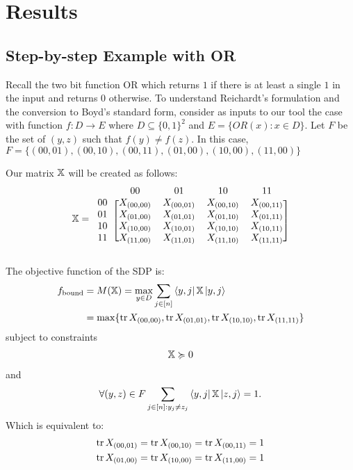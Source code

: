 \section{Results}

\subsection{Step-by-step Example with OR}
Recall the two bit function OR which returns $1$ if there
is at least a single $1$ in the input and returns $0$ otherwise.
To understand Reichardt's formulation and the conversion
to Boyd's standard form, consider as inputs to our tool
the case with function $f: D \rightarrow E$ where
$D \subseteq {\{0,1\}}^2$ and $E =\{OR(x): x \in D \}$.
Let $F$ be the set of $(y,z)$ such that $f(y) \neq f(z)$. In this
case, $F = \{(00,01), (00,10), (00,11), (01,00), (10,00), (11,00)\}$

Our matrix $\operatorname{\mathbb{X}}$ will be created as follows:
\begin{align}
\X = \begin{blockarray}{ccccc}
\qquad & 00 & 01 & 10 & 11 \\
\begin{block}{c[cccc]}
  00 & X_{(00,00)} & X_{(00,01)} & X_{(00,10)} & X_{(00,11)}\\
  01 & X_{(01,00)} & X_{(01,01)} & X_{(01,10)} & X_{(01,11)}\\
  10 & X_{(10,00)} & X_{(10,01)} & X_{(10,10)} & X_{(10,11)}\\
  11 & X_{(11,00)} & X_{(11,01)} & X_{(11,10)} & X_{(11,11)}\\
\end{block}
\end{blockarray} \nonumber 
\end{align}


The objective function of the SDP is:
\begin{align} \label{eq:reichardtObj} 
    f_{\text{bound}} &= M(\operatorname{\mathbb{X}}) = \max_{y \in D} \sum_{j \in [n]}
    \bra{y,j}\operatorname{\mathbb{X}}\ket{y,j} \nonumber \\
    &= \max\{ \operatorname{\text{tr}}{X_{(00,00)}}, \operatorname{\text{tr}}{X_{(01,01)}}, \operatorname{\text{tr}}{X_{(10,10)}}, \operatorname{\text{tr}}{X_{(11,11)}} \} \nonumber
\end{align}
subject to constraints
\begin{align}
    \operatorname{\mathbb{X}} \succcurlyeq 0  \nonumber 
\end{align}
and
\begin{align}
    \forall (y,z) \in F \sum_{j \in [n]: y_j \ne z_j} 
    \bra{y,j} \operatorname{\mathbb{X}} \ket{z, j} = 1. \nonumber 
\end{align}
Which is equivalent to:
\begin{align}
    \operatorname{\text{tr}}{X_{(00,01)}} &= \operatorname{\text{tr}}{X_{(00,10)}} = \operatorname{\text{tr}}{X_{(00,11)}} = 1 \nonumber \\
    \operatorname{\text{tr}}{X_{(01,00)}} &= \operatorname{\text{tr}}{X_{(10,00)}} = \operatorname{\text{tr}}{X_{(11,00)}} = 1 \nonumber
\end{align}

